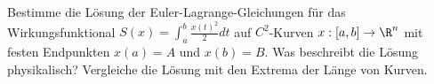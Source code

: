 \begin{prob}
Bestimme die L\"osung der Euler-Lagrange-Gleichungen f\"ur das
Wirkungsfunktional $S(x)=\int_a^b\frac{\dot x(t)^2}{2}dt$ auf $C^2$-Kurven
$x:[a,b]\to\R^n$ mit festen Endpunkten $x(a)=A$ und $x(b)=B$. 
Was beschreibt die L\"osung physikalisch? 
Vergleiche die L\"osung mit den Extrema der L\"ange von Kurven.  
\end{prob}
